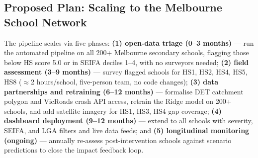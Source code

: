 \documentclass[11pt,a4paper]{article}
\begin{document}
\subsection{Proposed Plan: Scaling to the Melbourne School Network}
The pipeline scales via five phases: \textbf{(1) open-data triage (0--3 months)} — run the automated pipeline on all 200+ Melbourne secondary schools, flagging those below HS score 5.0 or in SEIFA deciles 1--4, with no surveyors needed; \textbf{(2) field assessment (3--9 months)} — survey flagged schools for HS1, HS2, HS4, HS5, HS8 ($\approx$2 hours/school, five-person team, no code changes); \textbf{(3) data partnerships and retraining (6--12 months)} — formalise DET catchment polygon and VicRoads crash API access, retrain the Ridge model on 200+ schools, and add satellite imagery for HS1, HS3, HS4 gap coverage; \textbf{(4) dashboard deployment (9--12 months)} — extend to all schools with severity, SEIFA, and LGA filters and live data feeds; and \textbf{(5) longitudinal monitoring (ongoing)} — annually re-assess post-intervention schools against scenario predictions to close the impact feedback loop.

\newpage
\end{document}

